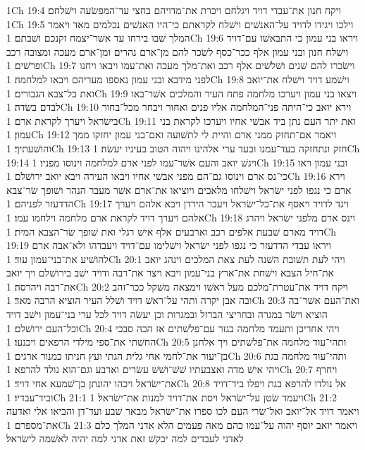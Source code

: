 1Ch 19:4  ויקח חנון את־עבדי דויד ויגלחם ויכרת את־מדויהם בחצי עד־המפשׂעה וישׁלחם׃
1Ch 19:5  וילכו ויגידו לדויד על־האנשׁים וישׁלח לקראתם כי־היו האנשׁים נכלמים מאד ויאמר המלך שׁבו בירחו עד אשׁר־יצמח זקנכם ושׁבתם׃
1Ch 19:6  ויראו בני עמון כי התבאשׁו עם־דויד וישׁלח חנון ובני עמון אלף ככר־כסף לשׂכר להם מן־ארם נהרים ומן־ארם מעכה ומצובה רכב ופרשׁים׃
1Ch 19:7  וישׂכרו להם שׁנים ושׁלשׁים אלף רכב ואת־מלך מעכה ואת־עמו ויבאו ויחנו לפני מידבא ובני עמון נאספו מעריהם ויבאו למלחמה׃
1Ch 19:8  וישׁמע דויד וישׁלח את־יואב ואת כל־צבא הגבורים׃
1Ch 19:9  ויצאו בני עמון ויערכו מלחמה פתח העיר והמלכים אשׁר־באו לבדם בשׂדה׃
1Ch 19:10  וירא יואב כי־היתה פני־המלחמה אליו פנים ואחור ויבחר מכל־בחור בישׂראל ויערך לקראת ארם׃
1Ch 19:11  ואת יתר העם נתן ביד אבשׁי אחיו ויערכו לקראת בני עמון׃
1Ch 19:12  ויאמר אם־תחזק ממני ארם והיית לי לתשׁועה ואם־בני עמון יחזקו ממך והושׁעתיך׃
1Ch 19:13  חזק ונתחזקה בעד־עמנו ובעד ערי אלהינו ויהוה הטוב בעיניו יעשׂה׃
1Ch 19:14  ויגשׁ יואב והעם אשׁר־עמו לפני ארם למלחמה וינוסו מפניו׃
1Ch 19:15  ובני עמון ראו כי־נס ארם וינוסו גם־הם מפני אבשׁי אחיו ויבאו העירה ויבא יואב ירושׁלם׃
1Ch 19:16  וירא ארם כי נגפו לפני ישׂראל וישׁלחו מלאכים ויוציאו את־ארם אשׁר מעבר הנהר ושׁופך שׂר־צבא הדדעזר לפניהם׃
1Ch 19:17  ויגד לדויד ויאסף את־כל־ישׂראל ויעבר הירדן ויבא אלהם ויערך אלהם ויערך דויד לקראת ארם מלחמה וילחמו עמו׃
1Ch 19:18  וינס ארם מלפני ישׂראל ויהרג דויד מארם שׁבעת אלפים רכב וארבעים אלף אישׁ רגלי ואת שׁופך שׂר־הצבא המית׃
1Ch 19:19  ויראו עבדי הדדעזר כי נגפו לפני ישׂראל וישׁלימו עם־דויד ויעבדהו ולא־אבה ארם להושׁיע את־בני־עמון עוד׃
1Ch 20:1  ויהי לעת תשׁובת השׁנה לעת צאת המלכים וינהג יואב את־חיל הצבא וישׁחת את־ארץ בני־עמון ויבא ויצר את־רבה ודויד ישׁב בירושׁלם ויך יואב את־רבה ויהרסה׃
1Ch 20:2  ויקח דויד את־עטרת־מלכם מעל ראשׁו וימצאה משׁקל ככר־זהב ובה אבן יקרה ותהי על־ראשׁ דויד ושׁלל העיר הוציא הרבה מאד׃
1Ch 20:3  ואת־העם אשׁר־בה הוציא וישׂר במגרה ובחריצי הברזל ובמגרות וכן יעשׂה דויד לכל ערי בני־עמון וישׁב דויד וכל־העם ירושׁלם׃
1Ch 20:4  ויהי אחריכן ותעמד מלחמה בגזר עם־פלשׁתים אז הכה סבכי החשׁתי את־ספי מילדי הרפאים ויכנעו׃
1Ch 20:5  ותהי־עוד מלחמה את־פלשׁתים ויך אלחנן בן־יעור את־לחמי אחי גלית הגתי ועץ חניתו כמנור ארגים׃
1Ch 20:6  ותהי־עוד מלחמה בגת ויהי אישׁ מדה ואצבעתיו שׁשׁ־ושׁשׁ עשׂרים וארבע וגם־הוא נולד להרפא׃
1Ch 20:7  ויחרף את־ישׂראל ויכהו יהונתן בן־שׁמעא אחי דויד׃
1Ch 20:8  אל נולדו להרפא בגת ויפלו ביד־דויד וביד־עבדיו׃
1Ch 21:1  ויעמד שׂטן על־ישׂראל ויסת את־דויד למנות את־ישׂראל׃
1Ch 21:2  ויאמר דויד אל־יואב ואל־שׂרי העם לכו ספרו את־ישׂראל מבאר שׁבע ועד־דן והביאו אלי ואדעה את־מספרם׃
1Ch 21:3  ויאמר יואב יוסף יהוה על־עמו כהם מאה פעמים הלא אדני המלך כלם לאדני לעבדים למה יבקשׁ זאת אדני למה יהיה לאשׁמה לישׂראל׃

